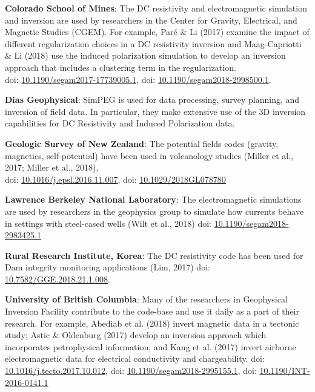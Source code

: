 \documentclass[a4paper, 11pt]{article}
\newcommand{\doi}[1]{doi: \href{https://doi.org/#1}{#1}}
\begin{document}
\begin{myitemize}\vspace{0.3cm}
\item \textbf{Colorado School of Mines}: The DC resistivity and electromagnetic simulation and inversion are used by researchers in the Center for Gravity, Electrical, and Magnetic Studies (CGEM). For example, Par\'e \& Li (2017) examine the impact of different regularization choices in a DC resistivity inversion and Maag-Capriotti \& Li (2018) use the induced polarization simulation to develop an inversion approach that includes a clustering term in the regularization. \\ \doi{10.1190/segam2017-17739005.1}, \doi{10.1190/segam2018-2998500.1}.

\item \textbf{Dias Geophysical}: SimPEG is used for data processing, survey planning, and inversion of field data. In particular, they make extensive use of the 3D inversion capabilities for DC Resistivity and Induced Polarization data.

\item \textbf{Geologic Survey of New Zealand}: The potential fields codes (gravity, magnetics, self-potential) have been used in volcanology studies (Miller et al., 2017; Miller et al., 2018), \\ \doi{10.1016/j.epsl.2016.11.007}, \doi{10.1029/2018GL078780}

\item \textbf{Lawrence Berkeley National Laboratory}: The electromagnetic simulations are used by researchers in the geophysics group to simulate how currents behave in settings with steel-cased wells (Wilt et al., 2018) \doi{10.1190/segam2018-2983425.1}

\item \textbf{Rural Research Institute, Korea}: The DC resistivity code has been used for Dam integrity monitoring applications (Lim, 2017) \doi{10.7582/GGE.2018.21.1.008}.



\item \textbf{University of British Columbia}: Many of the researchers in Geophysical Inversion Facility contribute to the code-base and use it daily as a part of their research. For example, Abediab et al. (2018) invert magnetic data in a tectonic study; Astic \& Oldenburg (2017) develop an inversion approach which incorporates petrophysical information; and Kang et al. (2017) invert airborne electromagnetic data for electrical conductivity and chargeability. \doi{10.1016/j.tecto.2017.10.012}, \doi{10.1190/segam2018-2995155.1}, \doi{10.1190/INT-2016-0141.1}
\end{myitemize}\vspace{0.3cm}
\end{document}
